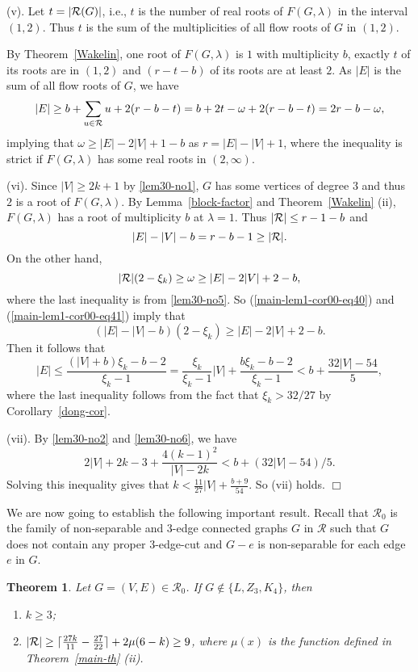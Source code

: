 \documentclass[11pt]{article}
\newtheorem{theo}{Theorem}
\newcommand {\red} {\textcolor{red}}
\newcommand{\proofend}{{\hfill$\Box$}}
\def \setr{{\cal R}}
\def \setgr {\mathscr{R}}
\newcommand{\beeq}{\begin{equation}}
\newcommand{\eneq}{\end{equation}}
\newcommand \nroot[1] 
{{\lceil \frac{27 #1}{11} -\frac{27}{22}\rceil+2\mu(6-#1)}}
\newcommand {\relabel}[1] {\label{#1} \red{[*: #1]}}\newcommand {\rebibitem}[1] {\bibitem{#1} \red{[*: #1]}}%
\def\relabel {\label} \def\rebibitem {\bibitem}  %
\begin{document}
(v).
Let $t=|\setr(G)|$, i.e., $t$ is the number of real roots 
of $F(G,\lambda)$ in the interval $(1,2)$.
Thus $t$ is the sum of the multiplicities of 
all flow roots of $G$ in $(1,2)$. 

By Theorem~\ref{Wakelin},
one root of $F(G,\lambda)$ is $1$ with multiplicity $b$, 
exactly $t$ of its roots are in $(1,2)$
and $(r-t-b)$ of its roots are at least $2$.
As $|E|$ is the sum of all flow roots of $G$, 
we have 
\beeq\relabel{main-lem1-eq1}
|E|\ge b+\sum_{u\in \setr}u+2(r-b-t)
=b+2t-\omega+2(r-b-t)
=2r-b-\omega,
\eneq
implying that $\omega\ge |E|-2|V|+1-b$ as $r=|E|-|V|+1$, 
where the inequality is strict if 
$F(G,\lambda)$ has some real roots in $(2,\infty)$.

(vi). 
Since $|V|\ge 2k+1$ by \ref{lem30-no1},
$G$ has some vertices of degree $3$ and thus 
$2$ is a root of $F(G,\lambda)$.
By Lemma~\ref{block-factor} and Theorem~\ref{Wakelin} (ii), 
$F(G,\lambda)$ has a root of multiplicity $b$ at $\lambda=1$. 
Thus $|\setr|\le r-1-b$ and 
\beeq\relabel{main-lem1-cor00-eq40}
|E|-|V|-b=r-b-1\ge |\setr|.
\eneq 
On the other hand, 
\beeq \relabel{main-lem1-cor00-eq41}
|\setr|(2-\xi_k)\ge \omega\ge |E|-2|V|+2-b,
\eneq 
where the last inequality is from \ref{lem30-no5}.
So (\ref{main-lem1-cor00-eq40}) and 
(\ref{main-lem1-cor00-eq41}) imply that 
\beeq   \relabel{main-lem1-cor00-eq42}
(|E|-|V|-b)(2-\xi_k)\ge |E|-2|V|+2-b.
\eneq 
Then it follows that 
\beeq \relabel{main-lem1-cor00-eq43}
|E|\le \frac{(|V|+b)\xi_k-b-2}{\xi_k-1}
=\frac{\xi_k}{\xi_k-1}|V|+\frac{b\xi_k-b-2}{\xi_k-1}
<b+\frac{32|V|-54}{5},
\eneq
where the last inequality follows from the fact that 
$\xi_k> 32/27$ by Corollary~\ref{dong-cor}.

(vii).  
By \ref{lem30-no2} and \ref{lem30-no6}, we have 
$$
2|V|+2k-3+\frac{4(k-1)^2}{|V|-2k}< b+(32|V|-54)/5.
$$
Solving this inequality gives that 
$k<\frac {11}{27}|V|+\frac{b+9}{54}$. So (vii) holds. 
\proofend


We are now going to establish 
the following important result. 
Recall that $\setgr_0$ is the family of 
non-separable and $3$-edge connected graphs 
$G$ in $\setgr$ 
such that $G$ does not contain 
any proper $3$-edge-cut
and $G-e$ is non-separable for each edge $e$ in $G$.


\begin{theo} \relabel{main-lem1}
Let $G=(V,E)\in \setgr_0$. 
If $G\not \in \{L, Z_3,K_4\}$, 
then  
\begin{enumerate}

\item \relabel{cor1-no01} 
$k\ge 3$;

\item \relabel{cor1-no2} 
$|\setr|\ge \nroot{k}\ge 9$,
where $\mu(x)$ is the function defined in 
Theorem~\ref{main-th} (ii).
\end{enumerate}
\end{theo}
\end{document}
